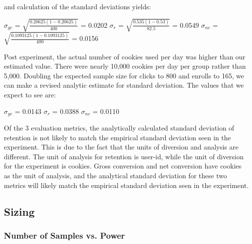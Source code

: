 \documentclass[paper=a4, fontsize=11pt]{scrartcl} %
\numberwithin{equation}{section} %
\numberwithin{figure}{section} %
\numberwithin{table}{section} %
\begin{document}
and calculation of the standard deviations yields: \newline

$\sigma_{gc}$ = $\sqrt{\frac{ 0.20625 (1 -  0.20625)}{400}}$ = 0.0202 \newline
$\sigma_{r}$ = $\sqrt{\frac{ 0.535 (1 -  0.53)}{82.5}}$ = 0.0549 \newline
$\sigma_{nc}$ = $\sqrt{\frac{ 0.1093125 (1 -  0.1093125)}{400}}$ = 0.0156
\newline

Post experiment, the actual number of cookies used per day was higher than our estimated value.  There were nearly 10,000 cookies per day per group rather than 5,000.  Doubling the expected sample size for clicks to 800 and enrolls to 165, we can make a revised analytic estimate for standard deviation.  The values that we expect to see are:
\newline

$\sigma_{gc}$ = 0.0143\newline
$\sigma_{r}$ = 0.0388\newline
$\sigma_{nc}$ = 0.0110
\newline

Of the 3 evaluation metrics, the analytically calculated standard deviation of retention is not likely to match the empirical standard deviation seen in the experiment.  This is due to the fact that the units of diversion and analysis are different.  The unit of analysis for retention is user-id, while the unit of diversion for the experiment is cookies.  Gross conversion and net conversion have cookies as the unit of analysis, and the analytical standard deviation for these two metrics will likely match the empirical standard deviation seen in the experiment. \newline


\subsection{Sizing}

\subsubsection{Number of Samples vs. Power}

\end{document}
